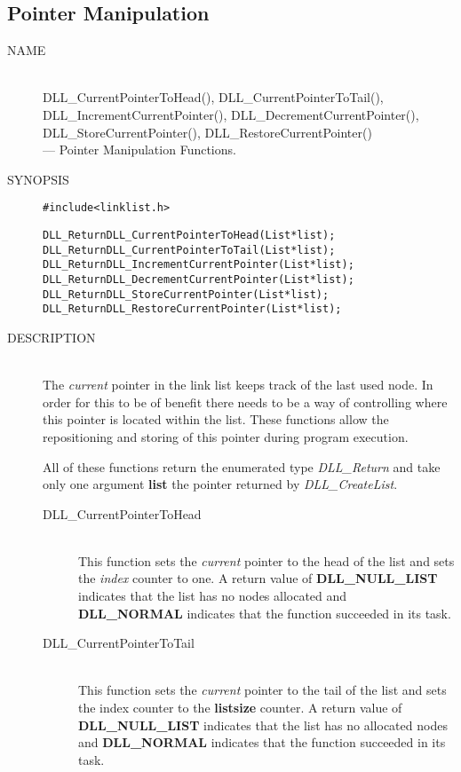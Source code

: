 \documentclass[10pt,letterpaper,titlepage]{article}
\begin{document}
\subsection{Pointer Manipulation}
\begin{description}
\item[NAME]\quad\\
DLL\_CurrentPointerToHead(), DLL\_CurrentPointerToTail(),\\
DLL\_IncrementCurrentPointer(), DLL\_DecrementCurrentPointer(),\\
DLL\_StoreCurrentPointer(), DLL\_RestoreCurrentPointer()\\
  --- Pointer Manipulation Functions.

\item[SYNOPSIS]
\begin{alltt}

#include <linklist.h>

DLL_Return DLL_CurrentPointerToHead(List *list);
DLL_Return DLL_CurrentPointerToTail(List *list);
DLL_Return DLL_IncrementCurrentPointer(List *list);
DLL_Return DLL_DecrementCurrentPointer(List *list);
DLL_Return DLL_StoreCurrentPointer(List *list);
DLL_Return DLL_RestoreCurrentPointer(List *list);
\end{alltt}

\item[DESCRIPTION]\quad\\
The \emph{current} pointer in the link list keeps track of the last used node.  In order for this to be of benefit there needs to be a way of controlling where this pointer is located within the list.  These functions allow the repositioning and storing of this pointer during program execution.
\vspace{8pt}

\noindent
All of these functions return the enumerated type \emph{DLL\_Return} and take only one argument \textbf{list} the pointer returned by \emph{DLL\_CreateList}.

 \begin{description}
 \item[DLL\_CurrentPointerToHead]\quad\\
 This function sets the \emph{current} pointer to the head of the list and sets the \emph{index} counter to one.  A return value of \textbf{DLL\_NULL\_LIST} indicates that the list has no nodes allocated and \textbf{DLL\_NORMAL} indicates that the function succeeded in its task.

 \item[DLL\_CurrentPointerToTail]\quad\\
 This function sets the \emph{current} pointer to the tail of the list and sets the index counter to the \textbf{listsize} counter.  A return value of \textbf{DLL\_NULL\_LIST} indicates that the list has no allocated nodes and \textbf{DLL\_NORMAL} indicates that the function succeeded in its task.


\end{description}
\end{description}
\end{document}
